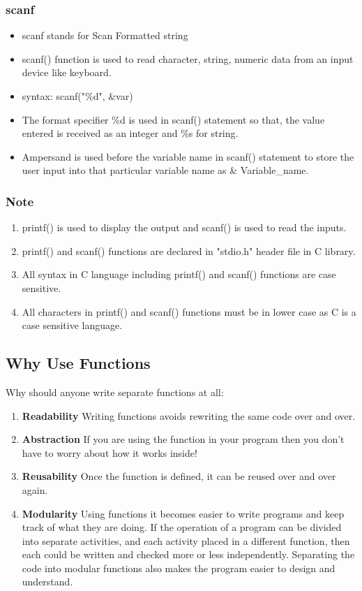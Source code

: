 \subsubsection{scanf}
\begin{itemize}
    \item scanf stands for Scan Formatted string
    \item scanf() function is used to read character, string, numeric data from an input device like keyboard.
    \item syntax: scanf("\%d", \&var)
    \item The format specifier \%d is used in scanf() statement so that, the value entered is received as an integer and \%s for string.
    \item Ampersand is used before the variable name in scanf() statement to store the user input into that particular variable name as \& Variable\_name.
\end{itemize}    

\subsubsection{Note}
\begin{enumerate}
    \item printf() is used to display the output and scanf() is used to read the inputs.
    \item printf() and scanf() functions are declared in "stdio.h" header file in C library.
    \item All syntax in C language including printf() and scanf() functions are case sensitive.
    \item All characters in printf() and scanf() functions must be in lower case as C is a case sensitive language.
\end{enumerate}


\subsection{Why Use Functions}
Why should anyone write separate functions at all:
\begin{enumerate}
    \item \textbf{Readability} Writing functions avoids rewriting the same code over and over.
    \item \textbf{Abstraction} If you are using the function in your program then you don't have to worry about how it works inside!
    \item \textbf{Reusability} Once the function is defined, it can be reused over and over again.
    \item \textbf{Modularity} Using functions it becomes easier to write programs and keep track of what they are doing. If the operation of a program can be divided into separate activities, and each activity placed in a different function, then each could be written and checked more or less independently. Separating the code into modular functions also makes the program easier to design and understand.
\end{enumerate}

